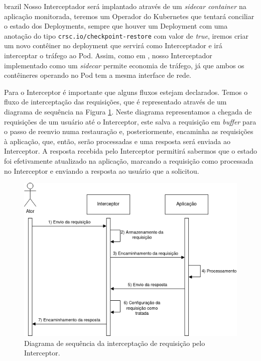 \begin{otherlanguage*}{brazil}
Nosso Interceptador será implantado através de um \textit{sidecar container} na aplicação
monitorada, teremos um Operador do Kubernetes que tentará conciliar o estado dos Deployments,
sempre que houver um Deployment com uma anotação do tipo \texttt{crsc.io/checkpoint-restore}
com valor de \textit{true}, iremos criar um novo contêiner no deployment que servirá como 
Interceptador e irá interceptar o tráfego ao Pod. Assim, como em \cite{muller2022architecture},
nosso Interceptador implementado como um \textit{sidecar} permite economia de tráfego, já que
ambos os contêineres operando no Pod tem a mesma interface de rede.

Para o Interceptor é importante que alguns fluxos estejam declarados. Temos o fluxo de
interceptação das requisições, que é representado através de um diagrama de sequência na
Figura \ref{fig:interceptor-request-interception}. Neste diagrama representamos a chegada
de requisições de um usuário até o Interceptor, este salva a requisição em \textit{buffer} para
o passo de reenvio numa restauração e, posteriormente, encaminha as requisições à aplicação,
que, então, serão processadas e uma resposta será enviada ao Interceptor. A resposta
recebida pelo Interceptor permitirá sabermos que o estado foi efetivamente atualizado
na aplicação, marcando a requisição como processada no Interceptor e enviando a resposta ao
usuário que a solicitou.

\begin{figure}[h]
\centering
\includegraphics[scale=0.64]{images/interceptor-intercept.png}
\caption{Diagrama de sequência da interceptação de requisição pelo Interceptor.}
\label{fig:interceptor-request-interception}
\end{figure}


\end{otherlanguage*}
